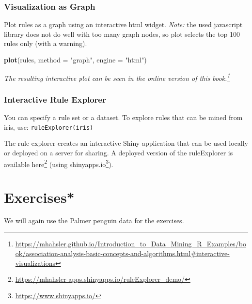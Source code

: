 \documentclass[
  notitlepage]{book}
\newenvironment{Shaded}{\begin{snugshade}}{\end{snugshade}}
\newcommand{\DataTypeTok}[1]{\textcolor[rgb]{0.13,0.29,0.53}{#1}}
\newcommand{\KeywordTok}[1]{\textcolor[rgb]{0.13,0.29,0.53}{\textbf{#1}}}
\newcommand{\NormalTok}[1]{#1}
\newcommand{\StringTok}[1]{\textcolor[rgb]{0.31,0.60,0.02}{#1}}
\DeclareRobustCommand{\href}[2]{#2\footnote{\url{#1}}}
\begin{document}
\hypertarget{visualization-as-graph}{%
\subsubsection{Visualization as Graph}\label{visualization-as-graph}}

Plot rules as a graph using an interactive html widget. \emph{Note:} the used
javascript library does not do well with too many graph nodes, so plot
selects the top 100 rules only (with a warning).

\begin{Shaded}
\begin{Highlighting}[]
\KeywordTok{plot}\NormalTok{(rules, }\DataTypeTok{method =} \StringTok{"graph"}\NormalTok{, }\DataTypeTok{engine =} \StringTok{"html"}\NormalTok{)}
\end{Highlighting}
\end{Shaded}

\emph{The resulting interactive plot can be seen in the \href{https://mhahsler.github.io/Introduction_to_Data_Mining_R_Examples/book/association-analysis-basic-concepts-and-algorithms.html\#interactive-visualizations}{online version of this book.}}

\hypertarget{interactive-rule-explorer}{%
\subsubsection{Interactive Rule Explorer}\label{interactive-rule-explorer}}

You can specify a rule set or a dataset. To explore rules that can be
mined from iris, use: \texttt{ruleExplorer(iris)}

The rule explorer creates an interactive Shiny application that can be
used locally or deployed on a server for sharing. A deployed version of
the ruleExplorer is available
\href{https://mhahsler-apps.shinyapps.io/ruleExplorer_demo/}{here} (using
\href{https://www.shinyapps.io/}{shinyapps.io}).

\hypertarget{exercises-3}{%
\section{Exercises*}\label{exercises-3}}

We will again use the Palmer penguin data for the exercises.
\end{document}
